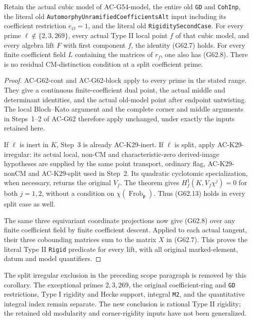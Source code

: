 \begin{corollary}
\label{AC-G62-all}
Retain the actual cubic model of AC-G54-model, the entire
old \texttt{GD} and \texttt{CohInp}, the literal old
\texttt{AutomorphyUnramifiedCoefficientsAlt} input including
its coefficient restriction $e_O=1$, and the literal old
\texttt{RigiditySecondCase}.  For every prime
$\ell\notin\{2,3,269\}$, every actual Type II local point
$f$ of that cubic model, and every algebra lift $F$ with
first component $f$, the identity (G62.7) holds.
For every finite coefficient field $L$ containing the
matrices of $r_f$, one also has (G62.8).
There is no residual CM-distinction condition at a split
coefficient prime.
\end{corollary}
\begin{proof}
AC-G62-cont and AC-G62-block apply to every prime in
the stated range.  They give a continuous finite-coefficient
dual point, the actual middle and determinant identities,
and the actual old-model point after endpoint untwisting.
The local Bloch--Kato argument and the complete corner and
middle arguments in Steps~1--2 of AC-G62 therefore apply
unchanged, under exactly the inputs retained here.

If $\ell$ is inert in $K$, Step~3 is already
AC-K29-inert.  If $\ell$ is split, apply
AC-K29-irregular: its actual local, non-CM and
characteristic-zero derived-image hypotheses are supplied
by the same point transport, ordinary flag,
AC-K29-nonCM and AC-K29-split used in Step~2.
Its quadratic cyclotomic specialization, when necessary,
returns the original $V_f$.  The theorem gives
$H_f^1(K,V_f\chi^j)=0$ for both $j=1,2$, without a
condition on $\chi(\operatorname{Frob}_{\mathfrak p})$.
Thus (G62.13) holds in every split case as well.

The same three equivariant coordinate projections now
give (G62.8) over any finite coefficient field by finite
coefficient descent.  Applied to each actual tangent,
their three cobounding matrices sum to the matrix $X$
in (G62.7).  This proves the literal Type II
\texttt{Rigid} predicate for every lift, with all
original marked-element, datum and model quantifiers.
\end{proof}

\begin{remark}
The split irregular exclusion in the preceding scope
paragraph is removed by this corollary.  The exceptional
primes $2,3,269$, the original coefficient-ring and
\texttt{GD} restrictions, Type I rigidity and Hecke
support, integral \texttt{M2}, and the quantitative
integral index remain separate.  The new conclusion is
rational Type II rigidity; the retained old modularity
and corner-rigidity inputs have not been generalized.
\end{remark}
